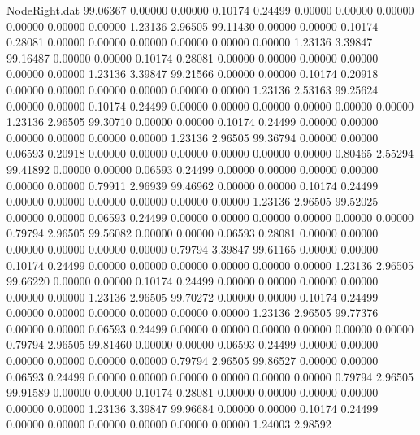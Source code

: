 \begin{filecontents}{NodeRight.dat}
  99.06367    0.00000    0.00000     0.10174    0.24499    0.00000    0.00000    0.00000    0.00000    0.00000    0.00000    1.23136    2.96505
  99.11430    0.00000    0.00000     0.10174    0.28081    0.00000    0.00000    0.00000    0.00000    0.00000    0.00000    1.23136    3.39847
  99.16487    0.00000    0.00000     0.10174    0.28081    0.00000    0.00000    0.00000    0.00000    0.00000    0.00000    1.23136    3.39847
  99.21566    0.00000    0.00000     0.10174    0.20918    0.00000    0.00000    0.00000    0.00000    0.00000    0.00000    1.23136    2.53163
  99.25624    0.00000    0.00000     0.10174    0.24499    0.00000    0.00000    0.00000    0.00000    0.00000    0.00000    1.23136    2.96505
  99.30710    0.00000    0.00000     0.10174    0.24499    0.00000    0.00000    0.00000    0.00000    0.00000    0.00000    1.23136    2.96505
  99.36794    0.00000    0.00000     0.06593    0.20918    0.00000    0.00000    0.00000    0.00000    0.00000    0.00000    0.80465    2.55294
  99.41892    0.00000    0.00000     0.06593    0.24499    0.00000    0.00000    0.00000    0.00000    0.00000    0.00000    0.79911    2.96939
  99.46962    0.00000    0.00000     0.10174    0.24499    0.00000    0.00000    0.00000    0.00000    0.00000    0.00000    1.23136    2.96505
  99.52025    0.00000    0.00000     0.06593    0.24499    0.00000    0.00000    0.00000    0.00000    0.00000    0.00000    0.79794    2.96505
  99.56082    0.00000    0.00000     0.06593    0.28081    0.00000    0.00000    0.00000    0.00000    0.00000    0.00000    0.79794    3.39847
  99.61165    0.00000    0.00000     0.10174    0.24499    0.00000    0.00000    0.00000    0.00000    0.00000    0.00000    1.23136    2.96505
  99.66220    0.00000    0.00000     0.10174    0.24499    0.00000    0.00000    0.00000    0.00000    0.00000    0.00000    1.23136    2.96505
  99.70272    0.00000    0.00000     0.10174    0.24499    0.00000    0.00000    0.00000    0.00000    0.00000    0.00000    1.23136    2.96505
  99.77376    0.00000    0.00000     0.06593    0.24499    0.00000    0.00000    0.00000    0.00000    0.00000    0.00000    0.79794    2.96505
  99.81460    0.00000    0.00000     0.06593    0.24499    0.00000    0.00000    0.00000    0.00000    0.00000    0.00000    0.79794    2.96505
  99.86527    0.00000    0.00000     0.06593    0.24499    0.00000    0.00000    0.00000    0.00000    0.00000    0.00000    0.79794    2.96505
  99.91589    0.00000    0.00000     0.10174    0.28081    0.00000    0.00000    0.00000    0.00000    0.00000    0.00000    1.23136    3.39847
  99.96684    0.00000    0.00000     0.10174    0.24499    0.00000    0.00000    0.00000    0.00000    0.00000    0.00000    1.24003    2.98592

\end{filecontents}
